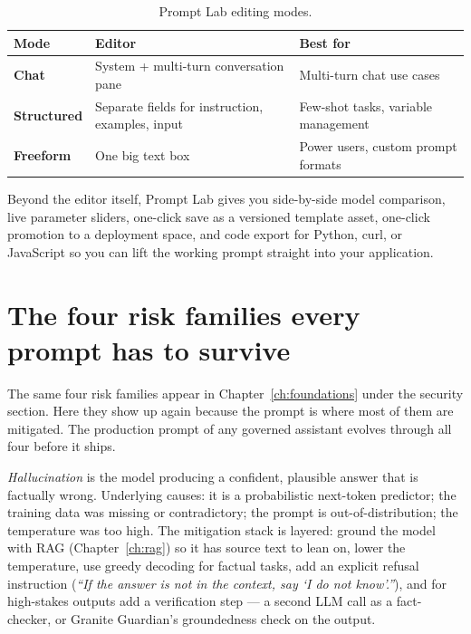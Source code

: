 \begin{table}[h]
\centering
\small
\begin{tabularx}{\textwidth}{l X X}
\toprule
\textbf{Mode} & \textbf{Editor} & \textbf{Best for} \\
\midrule
\textbf{Chat}       & System + multi-turn conversation pane            & Multi-turn chat use cases \\
\textbf{Structured} & Separate fields for instruction, examples, input & Few-shot tasks, variable management \\
\textbf{Freeform}   & One big text box                                 & Power users, custom prompt formats \\
\bottomrule
\end{tabularx}
\caption{Prompt Lab editing modes.}
\label{tab:prompt-lab-modes}
\end{table}

Beyond the editor itself, Prompt Lab gives you side-by-side model comparison, live parameter sliders, one-click save as a versioned template asset, one-click promotion to a deployment space, and code export for Python, curl, or JavaScript so you can lift the working prompt straight into your application.

\section{The four risk families every prompt has to survive}

The same four risk families appear in Chapter~\ref{ch:foundations} under the security section. Here they show up again because the prompt is where most of them are mitigated. The production prompt of any governed assistant evolves through all four before it ships.

\emph{Hallucination} is the model producing a confident, plausible answer that is factually wrong. Underlying causes: it is a probabilistic next-token predictor; the training data was missing or contradictory; the prompt is out-of-distribution; the temperature was too high. The mitigation stack is layered: ground the model with RAG (Chapter~\ref{ch:rag}) so it has source text to lean on, lower the temperature, use greedy decoding for factual tasks, add an explicit refusal instruction (\emph{``If the answer is not in the context, say `I do not know'.''}), and for high-stakes outputs add a verification step --- a second LLM call as a fact-checker, or Granite Guardian's groundedness check on the output.

